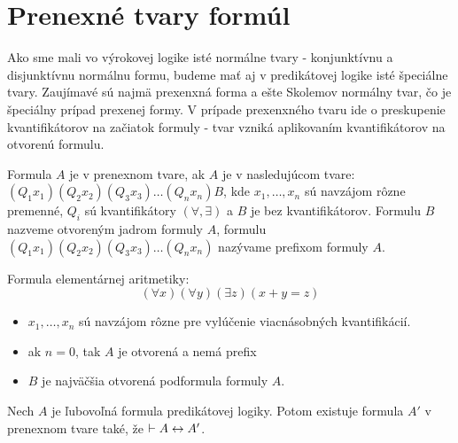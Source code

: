 
\section{Prenexné tvary formúl}

Ako sme mali vo výrokovej logike isté normálne tvary - konjunktívnu a
disjunktívnu normálnu formu, budeme mať aj v predikátovej logike isté
špeciálne tvary. Zaujímavé sú najmä prexenxná forma a ešte Skolemov
normálny tvar, čo je špeciálny prípad prexenej formy.
V prípade prexenxného tvaru ide o preskupenie kvantifikátorov na
začiatok formuly - tvar vzniká aplikovaním kvantifikátorov na otvorenú
formulu.


\begin{definicia}
    Formula $A$ je v prenexnom tvare, ak $A$ je v nasledujúcom tvare:
     $(Q_1 x_1) (Q_2 x_2) (Q_3 x_3) \dots (Q_n x_n) B$, kde
     $x_1, \dots , x_n$ sú navzájom rôzne premenné, $Q_i$ sú
     kvantifikátory $(\forall, \exists)$ a 
     $B$ je bez kvantifikátorov.
    Formulu $B$ nazveme otvoreným jadrom formuly $A$, 
    formulu $(Q_1 x_1) (Q_2 x_2) (Q_3 x_3) \dots (Q_n x_n)$ nazývame
    prefixom formuly $A$.
\end{definicia}

\begin{priklad}
    Formula elementárnej aritmetiky:
    \begin{equation*}
        (\forall x) (\forall y) (\exists z) (x+y=z)
    \end{equation*}
\end{priklad}

\begin{poznamka}
\begin{itemize}
 \item $x_1, \dots, x_n$ sú navzájom rôzne pre vylúčenie viacnásobných
    kvantifikácií.
 \item ak $n=0$, tak $A$ je otvorená a nemá prefix
 \item $B$ je najväčšia otvorená podformula formuly $A$.
\end{itemize}
\end{poznamka}


\begin{veta}
 Nech $A$ je ľubovoľná formula predikátovej logiky. Potom existuje
 formula $A'$ v prenexnom tvare také, že
 $\vdash A \leftrightarrow A'$.
 \label{veta:prenex}
\end{veta}

